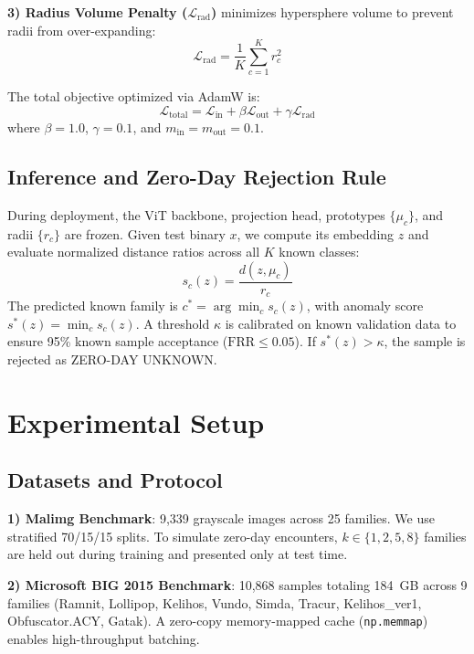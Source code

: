 \documentclass[conference]{IEEEtran}
\begin{document}
\textbf{3) Radius Volume Penalty ($\mathcal{L}_{\text{rad}}$)} minimizes hypersphere volume to prevent radii from over-expanding:
\begin{equation}
\mathcal{L}_{\text{rad}} = \frac{1}{K} \sum_{c=1}^K r_c^2
\end{equation}

The total objective optimized via AdamW is:
\begin{equation}
\mathcal{L}_{\text{total}} = \mathcal{L}_{\text{in}} + \beta \mathcal{L}_{\text{out}} + \gamma \mathcal{L}_{\text{rad}}
\end{equation}
where $\beta = 1.0$, $\gamma = 0.1$, and $m_{\text{in}} = m_{\text{out}} = 0.1$.

\subsection{Inference and Zero-Day Rejection Rule}
During deployment, the ViT backbone, projection head, prototypes $\{\mu_c\}$, and radii $\{r_c\}$ are frozen. Given test binary $x$, we compute its embedding $z$ and evaluate normalized distance ratios across all $K$ known classes:
\begin{equation}
s_c(z) = \frac{d(z, \mu_c)}{r_c}
\end{equation}
The predicted known family is $c^* = \arg\min_c s_c(z)$, with anomaly score $s^*(z) = \min_c s_c(z)$. A threshold $\kappa$ is calibrated on known validation data to ensure 95\% known sample acceptance ($\text{FRR} \leq 0.05$). If $s^*(z) > \kappa$, the sample is rejected as ZERO-DAY UNKNOWN.

\section{Experimental Setup}

\subsection{Datasets and Protocol}
\textbf{1) Malimg Benchmark}: 9,339 grayscale images across 25 families. We use stratified 70/15/15 splits. To simulate zero-day encounters, $k \in \{1, 2, 5, 8\}$ families are held out during training and presented only at test time.

\textbf{2) Microsoft BIG 2015 Benchmark}: 10,868 samples totaling 184~GB across 9 families (Ramnit, Lollipop, Kelihos, Vundo, Simda, Tracur, Kelihos\_ver1, Obfuscator.ACY, Gatak). A zero-copy memory-mapped cache (\texttt{np.memmap}) enables high-throughput batching.
\end{document}
